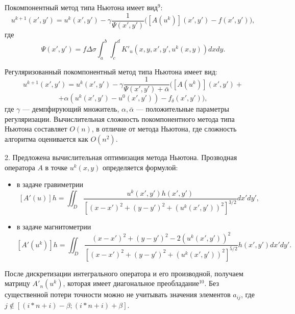 \documentclass[%
autoref,     %
href,        %
facsimile,   %
colorlinks,  %
]{disser}
\begin{document}
Покомпонентный метод типа Ньютона имеет вид$^9$:
$$u^{k+1}(x',y')=u^k(x',y')-\gamma\frac{1}{\varPsi(x',y')}\big([A(u^k)](x',y')-f(x',y')\big),$$
где $$\varPsi(x',y')=f\Delta\sigma\int_{a}^{b}\int_{c}^{d}K'_u(x,y, x',y',u^k(x,y)) dxdy.$$

Регуляризованный покомпонентный метод типа Ньютона имеет вид:
$$u^{k+1}(x',y')=u^k(x',y')-\gamma\frac{1}{\varPsi(x',y')+\bar{\alpha}}([A(u^k)](x',y')+$$ 
$$+\alpha (u^k(x',y')-u^0(x',y'))-f_\delta(x',y')),$$
где $\gamma$ --- демпфирующий множитель, $\alpha, \bar{\alpha}$ --- положительные параметры регуляризации.
{\scriptsize
\let\thefootnote\relax\let\thefootnote\relax{}
\let\thefootnote\relax\let\thefootnote\relax{}
}
Вычислительная сложность покомпонентного метода типа Ньютона составляет $O(n)$, в отличие от метода Ньютона, где сложность алгоритма оценивается как $O(n^2)$.

2. Предложена вычислительная оптимизация метода Ньютона. Прозводная оператора $A$ в точке $u^k(x,y)$ определяется формулой:
\begin{itemize}
	\item в задаче гравиметрии
	$$ [A'(u)]h=\iint_{D} \frac{u^k(x',y')h(x',y')}{[(x-x')^2+(y-y')^2+(u^k(x',y'))^2]^{3/2}}dx'dy',$$
	\item в задаче магнитометрии
	$$ [A'(u^k)]h=\iint_{D} \frac{(x-x')^2+(y-y')^2-2(u^k(x',y'))^2}{[(x-x')^2+(y-y')^2+(u^k(x',y'))^2]^{5/2}}h(x',y')dx'dy'.$$
\end{itemize}
После дискретизации интегрального оператора и его производной, получаем матрицу $A'_n(u^k)$, которая имеет диагональное преобладание$^{10}$. %
Без существенной потери точности можно не учитывать значения элементов
$a_{ij}$, где $j\notin[(i*n+i)-\beta;(i*n+i)+\beta]$.
\end{document}
